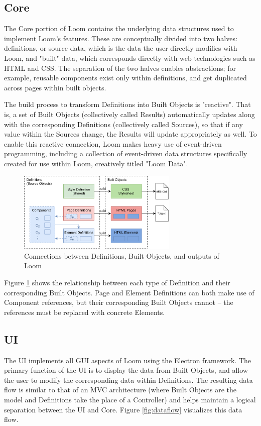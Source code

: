 \documentclass[conference, letterpaper]{IEEEtran}
\begin{document}
\subsection{Core}
The Core portion of Loom contains the underlying data structures used to implement Loom's features. These are conceptually divided into two halves: definitions, or source data, which is the data the user directly modifies with Loom, and "built" data, which corresponds directly with web technologies such as HTML and CSS. The separation of the two halves enables abstractions; for example, reusable components exist only within definitions, and get duplicated across pages within built objects.

The build process to transform Definitions into Built Objects is "reactive". That is, a set of Built Objects (collectively called Results) automatically updates along with the corresponding Definitions (collectively called Sources), so that if any value within the Sources change, the Results will update appropriately as well. To enable this reactive connection, Loom makes heavy use of event-driven programming, including a collection of event-driven data structures specifically created for use within Loom, creatively titled "Loom Data".

\begin{figure}[!t]
  \centering
  \includegraphics[width=3in]{../core.png}
  \caption{Connections between Definitions, Built Objects, and outputs of Loom}
  \label{fig:core}
\end{figure}

Figure \ref{fig:core} shows the relationship between each type of Definition and their corresponding Built Objects. Page and Element Definitions can both make use of Component references, but their corresponding Built Objects cannot -- the references must be replaced with concrete Elements.

\subsection{UI}
The UI implements all GUI aspects of Loom using the Electron framework. The primary function of the UI is to display the data from Built Objects, and allow the user to modify the corresponding data within Definitions. The resulting data flow is similar to that of an MVC architecture (where Built Objects are the model and Definitions take the place of a Controller) and helps maintain a logical separation between the UI and Core. Figure \ref{fig:dataflow} visualizes this data flow.
\end{document}
